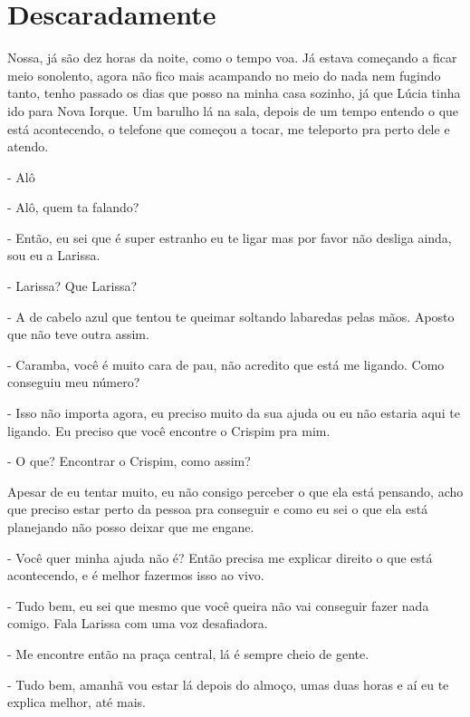 
\chapter{Descaradamente}
    



Nossa, já são dez horas da noite, como o tempo voa. Já estava começando a ficar meio sonolento, agora não fico mais acampando no meio do nada nem fugindo tanto, tenho passado os dias que posso na minha casa sozinho, já que Lúcia tinha ido para Nova Iorque. Um barulho lá na sala, depois de um tempo entendo o que está acontecendo, o telefone que começou a tocar, me teleporto pra perto dele e atendo.

- Alô

- Alô, quem ta falando?

- Então, eu sei que é super estranho eu te ligar mas por favor não desliga ainda, sou eu a Larissa.

- Larissa? Que Larissa?

- A de cabelo azul que tentou te queimar soltando labaredas pelas mãos. Aposto que não teve outra assim.

- Caramba, você é muito cara de pau, não acredito que está me ligando. Como conseguiu meu número?

- Isso não importa agora, eu preciso muito da sua ajuda ou eu não estaria aqui te ligando. Eu preciso que você encontre o Crispim pra mim.

- O que? Encontrar o Crispim, como assim?

Apesar de eu tentar muito, eu não consigo perceber o que ela está pensando, acho que preciso estar perto da pessoa pra conseguir e como eu sei o que ela está planejando não posso deixar que me engane.

- Você quer minha ajuda não é? Então precisa me explicar direito o que está acontecendo, e é melhor fazermos isso ao vivo.

- Tudo bem, eu sei que mesmo que você queira não vai conseguir fazer nada comigo. Fala Larissa com uma voz desafiadora.

- Me encontre então na praça central, lá é sempre cheio de gente.

- Tudo bem, amanhã vou estar lá depois do almoço, umas duas horas e aí eu te explica melhor, até mais.

